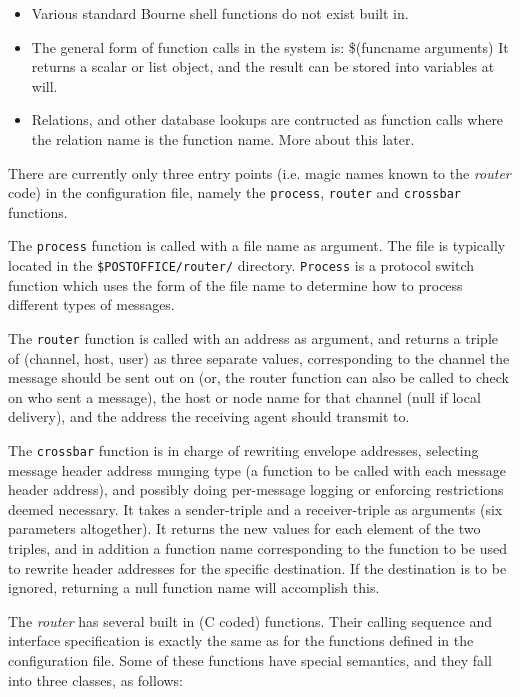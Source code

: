 \begin{itemize}
{\tt again}     

a function which retries the current case label for a match.

{\tt break}     

continues execution after the current case statement.
\item  Various standard Bourne shell functions do not exist built in.
\item  The general form of function calls in the system is:
\$(funcname arguments)
It returns a scalar or list object, and the result can be stored
into variables at will.
\item  Relations, and other database lookups are contructed as function calls
where the relation name is the function name.  More about this later.
\end{itemize}


There are currently only three entry points (i.e. magic names known to the
{\em router\/} code) in the configuration file, namely the {\tt process}, {\tt router} and 
{\tt crossbar} functions.

The {\tt process} function is called with a file name as argument. 
The file is typically located in the {\tt \$POSTOFFICE/router/} 
directory. {\tt Process} is a protocol switch function which uses the 
form of the file name to determine how to process different types of 
messages.

The {\tt router} function is called with an address as argument, and returns a
triple of (channel, host, user) as three separate values, corresponding to
the channel the message should be sent out on (or, the router function can
also be called to check on who sent a message), the host or node name for
that channel (null if local delivery), and the address the receiving agent
should transmit to.

The {\tt crossbar} function is in charge of rewriting envelope addresses,
selecting message header address munging type (a function to be called with
each message header address), and possibly doing per-message logging or
enforcing restrictions deemed necessary. It takes a sender-triple and a
receiver-triple as arguments (six parameters altogether). It returns the
new values for each element of the two triples, and in addition a function
name corresponding to the function to be used to rewrite header addresses
for the specific destination.  If the destination is to be ignored,
returning a null function name will accomplish this.

The {\em router\/} has several built in (C coded) functions.  Their calling
sequence and interface specification is exactly the same as for the
functions defined in the configuration file.  Some of these functions have
special semantics, and they fall into three classes, as follows:


